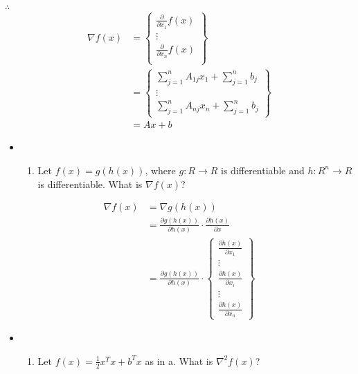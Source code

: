 \documentclass[11pt]{article}
\providecommand{\tightlist}{%
      \setlength{\itemsep}{0pt}\setlength{\parskip}{0pt}}
\begin{document}
\(\therefore\) \[\begin{aligned}
\nabla f(x) &= \left\{
        \begin{matrix}
            \frac{\partial}{\partial x_1}f(x) \\
            \vdots \\
            \frac{\partial}{\partial x_n}f(x) \\
        \end{matrix}\right\} \\
    &= \left\{
        \begin{matrix}
            \sum_{j=1}^{n}A_{1j}x_1 + \sum_{j=1}^{n}b_j \\
            \vdots \\
            \sum_{j=1}^{n}A_{nj}x_n + \sum_{j=1}^{n}b_j
        \end{matrix}
        \right\} \\
    &= Ax+b
\end{aligned}\]

    \begin{itemize}
\item
  \begin{enumerate}
  \def\labelenumi{\alph{enumi})}
  \setcounter{enumi}{1}
  \tightlist
  \item
    Let \(f(x) = g(h(x))\), where \(g:R\to R\) is differentiable and
    \(h: R^n\to R\) is differentiable. What is \(\nabla f(x)\)?
  \end{enumerate}
\end{itemize}

    \[\begin{aligned}
\nabla f(x) &= \nabla g(h(x)) \\
    &= \frac{\partial g(h(x))}{\partial h(x)} \cdot \frac{\partial h(x)}{\partial x} \\
    &= \frac{\partial g(h(x))}{\partial h(x)} \cdot \left\{\begin{matrix}
        \frac{\partial h(x)}{\partial x_1} \\
        \vdots \\
        \frac{\partial h(x)}{\partial x_i} \\
        \vdots \\
        \frac{\partial h(x)}{\partial x_n}
    \end{matrix}\right\}
\end{aligned}\]

    \begin{itemize}
\item
  \begin{enumerate}
  \def\labelenumi{\alph{enumi})}
  \setcounter{enumi}{2}
  \tightlist
  \item
    Let \(f(x) = \frac{1}{2}x^Tx + b^Tx\) as in a. What is
    \(\nabla^2f(x)\)?
  \end{enumerate}
\end{itemize}
\end{document}
